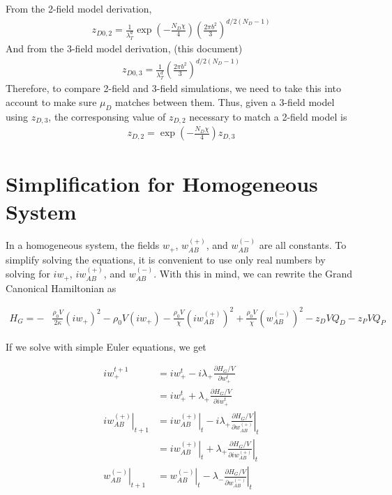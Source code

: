 \documentclass{article}
\begin{document}
From the 2-field model derivation,
\begin{align*}
  z_{D0,2} = \frac{1}{\lambda_T^d}
  \exp \left( -\frac{N_D\chi}{4}  \right)
  \left( \frac{2\pi b^2}{3} \right)^{d/2(N_D-1)} 
\end{align*}
And from the 3-field model derivation, (this document)
\begin{align*}
  z_{D0,3} = \frac{1}{\lambda_T^d}
  \left( \frac{2\pi b^2}{3} \right)^{d/2(N_D-1)} 
\end{align*}
Therefore, to compare 2-field and 3-field simulations, we need to take this
  into account to make sure $\mu_D$ matches between them.
Thus, given a 3-field model using $z_{D,3}$, the corresponsing value of
  $z_{D,2}$ necessary to match a 2-field model is
\begin{align*}
  z_{D,2} = \exp \left( -\frac{N_D\chi}{4}  \right) z_{D,3}
\end{align*}

\section{Simplification for Homogeneous System}

In a homogeneous system, the fields $w_+$, $w_{AB}^{(+)}$, and $w_{AB}^{(-)}$
  are all constants.
To simplify solving the equations, it is convenient to use only real numbers by
  solving for $iw_+$, $iw_{AB}^{(+)}$, and $w_{AB}^{(-)}$.
With this in mind, we can rewrite the Grand Canonical Hamiltonian as

\begin{align*}
  H_G = - &\frac{\rho_0 V}{2\kappa} (i w_+)^2
        - \rho_0 V (i w_+)
        - \frac{\rho_0 V}{\chi} (i w_{AB}^{(+)})^2
        + \frac{\rho_0 V}{\chi} (w_{AB}^{(-)})^2
        - z_D V Q_D
        - z_P V Q_P
\end{align*}

If we solve with simple Euler equations, we get

\begin{align*}
  iw_+^{t+1} &= iw_+^t - i\lambda_+ \frac{\partial H_G/V}{\partial w_+^t} \\
    &= iw_+^t + \lambda_+ \frac{\partial H_G/V}{\partial iw_+^t} \\
  \left. iw_{AB}^{(+)} \right|_{t+1} &= \left. iw_{AB}^{(+)} \right|_t
    - i\lambda_+ \left. \frac{\partial H_G/V}{\partial w_{AB}^{(+)}} \right|_t \\
    &= \left. iw_{AB}^{(+)} \right|_t
    + \lambda_+ \left. \frac{\partial H_G/V}{\partial iw_{AB}^{(+)}} \right|_t \\
  \left. w_{AB}^{(-)} \right|_{t+1} &= \left. w_{AB}^{(-)} \right|_t
    - \lambda_- \left. \frac{\partial H_G/V}{\partial w_{AB}^{(-)}} \right|_t
\end{align*}
\end{document}
